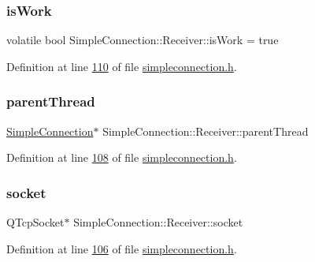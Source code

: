 \subsubsection{\texorpdfstring{is\+Work}{isWork}}
{\footnotesize\ttfamily volatile bool Simple\+Connection\+::\+Receiver\+::is\+Work = true\hspace{0.3cm}{\ttfamily [protected]}}



Definition at line \hyperlink{a00008_source_l00110}{110} of file \hyperlink{a00008_source}{simpleconnection.\+h}.

\mbox{\label{a00133_a86812570e3dd426878732f5ea4ae3b9e}} 
\subsubsection{\texorpdfstring{parent\+Thread}{parentThread}}
{\footnotesize\ttfamily \hyperlink{a00125}{Simple\+Connection}$\ast$ Simple\+Connection\+::\+Receiver\+::parent\+Thread\hspace{0.3cm}{\ttfamily [protected]}}



Definition at line \hyperlink{a00008_source_l00108}{108} of file \hyperlink{a00008_source}{simpleconnection.\+h}.

\mbox{\label{a00133_a2a61dfb0c5aaff07952e9cc933329fe4}} 
\subsubsection{\texorpdfstring{socket}{socket}}
{\footnotesize\ttfamily Q\+Tcp\+Socket$\ast$ Simple\+Connection\+::\+Receiver\+::socket\hspace{0.3cm}{\ttfamily [protected]}}



Definition at line \hyperlink{a00008_source_l00106}{106} of file \hyperlink{a00008_source}{simpleconnection.\+h}.

